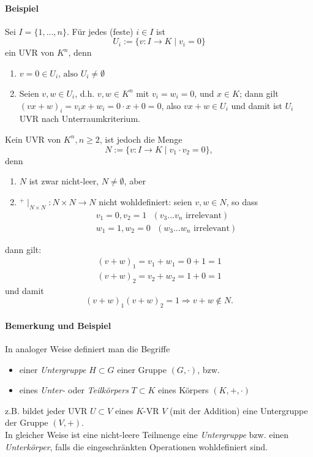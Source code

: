 \paragraph{Beispiel}
	Sei $I=\{1,...,n\}$. Für jedes (feste) $i\in I$ ist
		\[ U_i := \{v:I\to K\mid v_i =0\} \]
	ein UVR von $K^n$, denn
	\begin{enumerate}
		\item $v = 0 \in U_i\text{, also } U_i \neq \emptyset$
		\item Seien $v,w\in U_i$, d.h. $v,w\in K^n$ mit $v_i =w_i =0$, und $x\in K$; dann gilt $(vx+w)_i = v_ix+ w_i = 0\cdot x + 0 = 0$, also $vx+w\in U_i$ und damit ist $U_i$ UVR nach Unterraumkriterium.  
	\end{enumerate}
	Kein UVR von $K^n, n\geq 2$, ist jedoch die Menge
		\[ N:=\{v:I\to K\mid v_1\cdot v_2 = 0\}, \]
	denn 
	\begin{enumerate}
		\item $N$ ist zwar nicht-leer, $N\neq \emptyset$, aber
		\item $^+\mid_{N\times N}: N\times N\to N$ nicht wohldefiniert: seien $v,w\in N$, so dass
			\begin{gather*}
				v_1=0, v_2=1\text{ }(v_3 ... v_n \text{ irrelevant})\\
				w_1=1, w_2 = 0\text{ }(w_3 ... w_n \text{ irrelevant})
			\end{gather*}
	\end{enumerate}
	dann gilt:
	\begin{gather*}
		(v+w)_1 = v_1 + w_1 = 0+1=1\\
		(v+w)_2 = v_2 + w_2 = 1+0 = 1
	\end{gather*}
	und damit
		\[ (v+w)_1(v+w)_2 = 1 \Rightarrow v+w\notin N. \]

\paragraph{Bemerkung und Beispiel}
	In analoger Weise definiert man die Begriffe
	\begin{itemize}
		\item einer \emph{Untergruppe} $H\subset G$ einer Gruppe $(G,\cdot)$, bzw.
		\item eines \emph{Unter-} oder \emph{Teilkörpers} $T\subset K$ eines Körpers $(K,+,\cdot )$
	\end{itemize}
	
	z.B. bildet jeder UVR $U\subset V$ eines $K$-VR $V$ (mit der Addition) eine Untergruppe der Gruppe $(V,+)$.\\
        In gleicher Weise ist eine nicht-leere Teilmenge eine \emph{Untergruppe} bzw. einen \emph{Unterkörper}, falls die eingeschränkten Operationen wohldefiniert sind.
    
